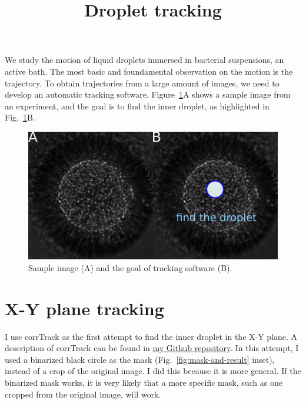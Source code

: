 \documentclass[onecolumn,aps, pre,amsmath,amssymb,longbibliography,12pt]{revtex4-2}
\begin{document}
\title{Droplet tracking}
\maketitle

We study the motion of liquid droplets immersed in bacterial suspensions, an active bath.
The most basic and foundamental observation on the motion is the trajectory.
To obtain trajectories from a large amount of images, we need to develop an automatic tracking software.
Figure~\ref{fig:sample-image}A shows a sample image from an experiment, and the goal is to find the inner droplet, as highlighted in Fig.~\ref{fig:sample-image}B.

\begin{figure}[h]
  \includegraphics{sample-image.png}
  \caption{Sample image (A) and the goal of tracking software (B).}
  \label{fig:sample-image}
\end{figure}

\section{X-Y plane tracking}

I use corrTrack as the first attempt to find the inner droplet in the X-Y plane.
A description of corrTrack can be found in \href{https://github.com/ZLoverty/Python/tree/master/Tracking/corrTrack}{my Github repository}.
In this attempt, I used a binarized black circle as the mask (Fig.~\ref{fig:mask-and-result} inset), instead of a crop of the original image.
I did this because it is more general.
If the binarized mask works, it is very likely that a more specific mask, such as one cropped from the original image, will work.
\end{document}
